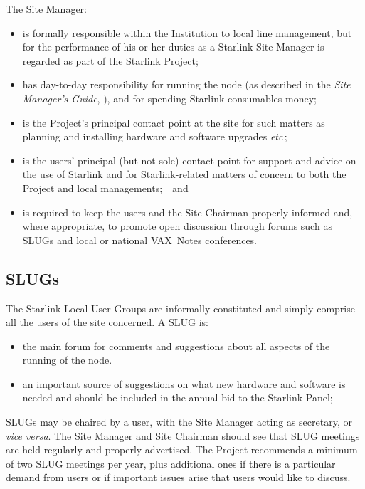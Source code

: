 The Site Manager:
\begin{itemize}
\item is formally responsible within the Institution to local line
      management, but for the performance of his or her
      duties as a Starlink Site Manager
      is regarded as part of the Starlink Project;
\item has day-to-day responsibility for
      running the node (as described in the {\it Site Manager's Guide},
      ), and for spending Starlink consumables money;
\item is the Project's principal contact point at the site for such
      matters as planning and installing hardware and
      software upgrades {\it etc}\,;
\item is the users' principal (but not sole) contact point for support and
      advice on the use of Starlink
      and for Starlink-related matters of concern to both the
      Project and local managements;~~and
\item is required to keep the users and the Site Chairman
      properly informed and, where appropriate, to promote open
      discussion through forums such as SLUGs and local or national VAX~Notes
      conferences.
\end{itemize}

\subsection{SLUGs}

The Starlink Local User Groups are informally constituted and
simply comprise all the users of the site concerned.  A SLUG is:
\begin{itemize}
\item the main forum for comments and suggestions 
      about all aspects of the running of the node.
\item an important source of suggestions on what
      new hardware and software is needed and should be included
      in the annual bid to the Starlink Panel;
\end{itemize}
SLUGs may be chaired by a user, with the Site Manager acting
as secretary, or {\it vice versa}.  The Site Manager and
Site Chairman should see that SLUG meetings are held regularly
and properly advertised.  The Project recommends a minimum of two
SLUG meetings per year, plus
additional ones if there is a particular demand from users or if
important issues arise that users would like to discuss.

